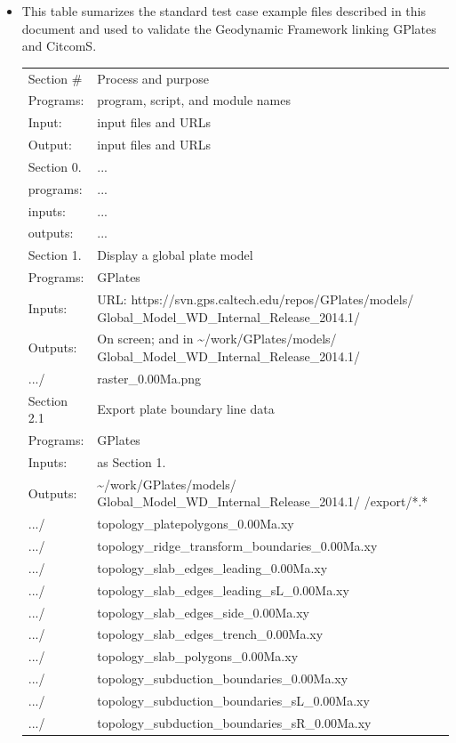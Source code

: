\documentclass[letterpaper,12pt]{article}
\newcommand{\gplatesmodel}{Global\_Model\_WD\_Internal\_Release\_2014.1/ }
\begin{document}
\begin{itemize}
\item This table sumarizes the standard test case example files described in this document and used to validate the Geodynamic Framework linking GPlates and CitcomS.

\scriptsize
\begin{tabular}{ | l | l | }
  \hline \hline \hline
  Section \# & Process and purpose \\
  Programs: & program, script, and module names \\
  Input: & input files and URLs \\
  Output: & input files and URLs \\
  \hline \hline \hline
  Section 0. & ... \\
  programs: & ... \\
  inputs: & ... \\
  outputs: & ... \\
  \hline \hline
  Section 1. & Display a global plate model \\
  Programs: & GPlates  \\
  Inputs: & URL: https://svn.gps.caltech.edu/repos/GPlates/models/ \gplatesmodel \\
  Outputs: & On screen; and in \~{ }/work/GPlates/models/ \gplatesmodel \\
  \hline
.../ & raster\_0.00Ma.png \\

  \hline \hline
  Section 2.1 & Export plate boundary line data \\ 
  Programs: & GPlates  \\
  Inputs: & as Section 1.  \\
  Outputs: & \~{}/work/GPlates/models/ \gplatesmodel /export/*.* \\
  \hline
.../ & topology\_platepolygons\_0.00Ma.xy \\
.../ & topology\_ridge\_transform\_boundaries\_0.00Ma.xy \\
.../ & topology\_slab\_edges\_leading\_0.00Ma.xy \\
.../ & topology\_slab\_edges\_leading\_sL\_0.00Ma.xy \\
.../ & topology\_slab\_edges\_side\_0.00Ma.xy \\
.../ & topology\_slab\_edges\_trench\_0.00Ma.xy \\
.../ & topology\_slab\_polygons\_0.00Ma.xy \\
.../ & topology\_subduction\_boundaries\_0.00Ma.xy \\
.../ & topology\_subduction\_boundaries\_sL\_0.00Ma.xy \\
.../ & topology\_subduction\_boundaries\_sR\_0.00Ma.xy \\


\end{tabular}
\end{itemize}
\end{document}
